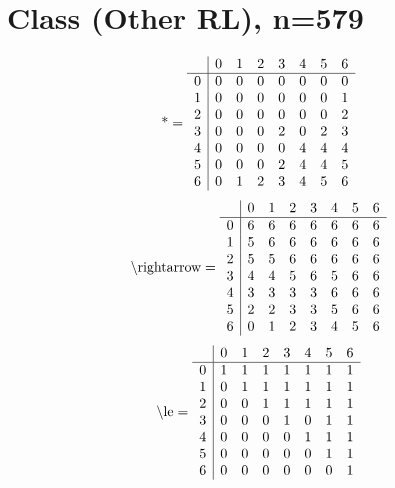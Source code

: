 \documentclass[11pt]{article}
\begin{document}
\section{Class (Other RL), n=579}
\[\text{*} = 
\begin{array}{r | r r r r r r r}
 & 0 & 1 & 2 & 3 & 4 & 5 & 6 \\ \hline
0 & 0 & 0 & 0 & 0 & 0 & 0 & 0 \\
1 & 0 & 0 & 0 & 0 & 0 & 0 & 1 \\
2 & 0 & 0 & 0 & 0 & 0 & 0 & 2 \\
3 & 0 & 0 & 0 & 2 & 0 & 2 & 3 \\
4 & 0 & 0 & 0 & 0 & 4 & 4 & 4 \\
5 & 0 & 0 & 0 & 2 & 4 & 4 & 5 \\
6 & 0 & 1 & 2 & 3 & 4 & 5 & 6 \\
\end{array}
\]
\[\text{\textbackslash rightarrow} = 
\begin{array}{r | r r r r r r r}
 & 0 & 1 & 2 & 3 & 4 & 5 & 6 \\ \hline
0 & 6 & 6 & 6 & 6 & 6 & 6 & 6 \\
1 & 5 & 6 & 6 & 6 & 6 & 6 & 6 \\
2 & 5 & 5 & 6 & 6 & 6 & 6 & 6 \\
3 & 4 & 4 & 5 & 6 & 5 & 6 & 6 \\
4 & 3 & 3 & 3 & 3 & 6 & 6 & 6 \\
5 & 2 & 2 & 3 & 3 & 5 & 6 & 6 \\
6 & 0 & 1 & 2 & 3 & 4 & 5 & 6 \\
\end{array}
\]
\[\text{\textbackslash le} = 
\begin{array}{r | r r r r r r r}
 & 0 & 1 & 2 & 3 & 4 & 5 & 6 \\ \hline
0 & 1 & 1 & 1 & 1 & 1 & 1 & 1 \\
1 & 0 & 1 & 1 & 1 & 1 & 1 & 1 \\
2 & 0 & 0 & 1 & 1 & 1 & 1 & 1 \\
3 & 0 & 0 & 0 & 1 & 0 & 1 & 1 \\
4 & 0 & 0 & 0 & 0 & 1 & 1 & 1 \\
5 & 0 & 0 & 0 & 0 & 0 & 1 & 1 \\
6 & 0 & 0 & 0 & 0 & 0 & 0 & 1 \\
\end{array}
\]
\end{document}
